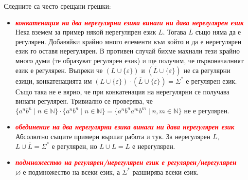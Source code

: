 \begin{warning}
    Следните са често срещани грешки:
    \begin{itemize}
        \item \textbf{\textit{\textcolor{red}{конкатенация на два нерегулярни езика винаги ни дава нерегулярен език}}} \\
              Нека вземем за пример някой нерегулярен език $L$.
              Тогава $\overline{L}$ също няма да е регулярен.
              Добавяйки крайно много елементи към който и да е нерегулярен език го оставя нерегулярен.
              В противен случай бихме махнали тези крайно много думи (те образуват регулярен език) и ще получим, че първоначалният език е регулярен.
              Въпреки че $(L \cup \{ \varepsilon \})$ и $(\overline{L} \cup \{ \varepsilon \})$ не са регулярни езици,
              конкатенацията им $(L \cup \{ \varepsilon \}) \cdot (\overline{L} \cup \{ \varepsilon \}) = \Sigma^*$ е регулярен език.
              Също така не е вярно, че при конкатенация на нерегулярни се получава винаги регулярен.
              Тривиално се проверява, че $\{ a^nb^n \mid n \in \mathbb{N} \} \cdot \{ a^nb^n \mid n \in \mathbb{N} \} = \{ a^nb^na^mb^m \mid n, m \in \mathbb{N} \}$ не е регулярен.

        \item \textbf{\textit{\textcolor{red}{обединение на два нерегулярни езика винаги ни дава нерегулярен език}}} \\
              Абсолютно същите примери вършат работа и тук. За нерегулярен $L$, $L \cup \overline{L} = \Sigma^*$ е регулярен, но $L \cup L = L$ е нерегулярен.
        \item \textbf{\textit{\textcolor{red}{подмножество на регулярен/нерегулярен език е регулярен/нерегулярен}}} \\
              $\varnothing$ е подмножество на всеки език, а $\Sigma^*$ разширява всеки език.
    \end{itemize}
\end{warning}
